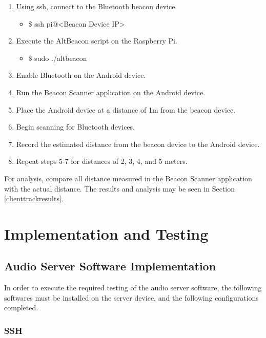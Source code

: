 \documentclass[11pt,a4paper,headinclude=false,footinclude=false]{scrreprt}
\begin{document}
\begin{enumerate}
 \item Using ssh, connect to the Bluetooth beacon device.
 \begin{itemize}
  \item \$ ssh pi@<Beacon Device IP>
 \end{itemize}
 \item Execute the AltBeacon script on the Raspberry Pi.
 \begin{itemize}
  \item \$ sudo ./altbeacon
 \end{itemize}
 \item Enable Bluetooth on the Android device.
 \item Run the Beacon Scanner application on the Android device.
 \item Place the Android device at a distance of 1m from the beacon device.
 \item Begin scanning for Bluetooth devices.
 \item Record the estimated distance from the beacon device to the Android
 device.
 \item Repeat steps 5-7 for distances of 2, 3, 4, and 5 meters.
\end{enumerate}

For analysis, compare all distance measured in the Beacon Scanner
application with the actual distance. The results and analysis may be
seen in Section \ref{clienttrackresults}.

\chapter{Implementation and Testing}\label{implementation-and-testing}

\section{\texorpdfstring{Audio Server Software Implementation
\label{audioserverimplementation}}{Audio Server Software Implementation }}\label{audio-server-software-implementation}

In order to execute the required testing of the audio server software,
the following softwares must be installed on the server device, and the
following configurations completed.

\subsection{SSH}\label{ssh}
\end{document}
